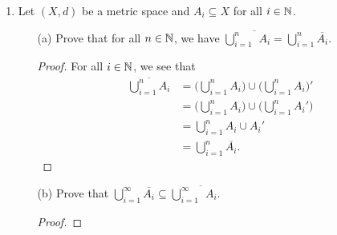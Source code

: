 \documentclass[a4paper]{article}
\begin{document}
\begin{enumerate}
\begin{proof}
            \( (\Longleftarrow) \) Let \( p \in X  \) and let \( A \subseteq X  \). We need to show that \( A  \) is dense in \( X  \); that is, we need to show that \( p  \) is either a limit point of \( A  \) or \( p \in A  \). Suppose that \( p \notin A  \). We will show that \( p  \) is a limit point of \( A  \). Let \( \epsilon > 0 \) and consider the open neighborhood \( {N}_{\epsilon}(p) \). By assumption, the open ball \( {N}_{\epsilon}(p) \) contains a nonempty intersection with \( A  \); that is,  
            \[  {N}_{\epsilon}(p) \cap A \neq \emptyset. \]
            Subsequently, we have
            \[  {N}_{\epsilon}(p) \cap A \setminus  \{ p\} \neq \emptyset.  \]
            Thus, \( p  \) is a limit point of \( A  \). On the other hand, if \( p  \) is not a limit point of \( A  \), then \( p \) is an isolated point of \( A  \). Thus, \( p \in A  \). 
        \end{proof}
        \item Let \( (X,d) \) be a metric space and \( {A}_{i} \subseteq X \) for all \( i \in \mathbb{N} \). 
            \begin{enumerate}
                \item[(a)] Prove that for all \( n \in \mathbb{N}  \), we have \( \overline{\bigcup_{ i=1  }^{ n }  } {A}_{i} = \bigcup_{ i=1 }^{ n }  \overline{{A}_{i}}. \)
                    \begin{proof}
                    For all \( i \in \mathbb{N}  \), we see that 
                    \begin{align*}
                        \overline{\bigcup_{ i=1  }^{ n }  {A}_{i}} &= \Big(  \bigcup_{ i =1  }^{ n }  {A}_{i} \Big) \cup \Big(  \bigcup_{ i=1 }^{ n } {A}_{i} \Big)' \\
                                                                   &= \Big( \bigcup_{ i= 1}^{ n }  {A}_{i} \Big) \cup \Big(  \bigcup_{ i=1  }^{ n }  {A}_{i}' \Big) \\
                                                                   &= \bigcup_{ i=1  }^{ n }  {A}_{i} \cup {A}_{i}' \\
                &= \bigcup_{ i=1  }^{ n }  \overline{{A}_{i}}.
                    \end{align*}
                    \end{proof}
                \item[(b)] Prove that \( \bigcup_{ i=1 }^{ \infty  }  \overline{{A}_{i}} \subseteq  \overline{\bigcup_{ i=1 }^{ \infty  } } {A}_{i} \).
                    \begin{proof}

\end{proof}
\end{enumerate}
\end{enumerate}
\end{document}
